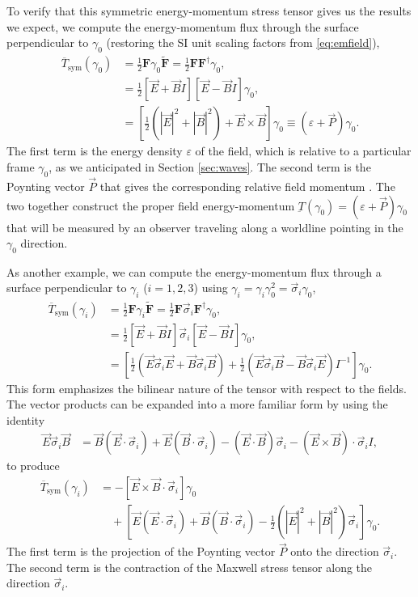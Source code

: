 \documentclass[1p,sort&compress]{elsarticle}
\numberwithin{equation}{section}
\newcommand{\rv}[1]{\vec{#1}}
\newcommand{\bv}[1]{\mathbf{#1}}
\begin{document}
To verify that this symmetric energy-momentum stress tensor gives us the results we expect, we compute the energy-momentum flux through the surface perpendicular to $\gamma_0$ (restoring the SI unit scaling factors from \eqref{eq:emfield}),
\begin{align}\label{eq:symemflux}
  \overline{T}_{\text{sym}}(\gamma_0) &= \frac{1}{2}\bv{F}\gamma_0\widetilde{\bv{F}} = \frac{1}{2}\bv{F}\bv{F}^\dagger\gamma_0, \\
  &= \frac{1}{2}\left[\rv{E} + \rv{B}I\right]\left[\rv{E} - \rv{B}I\right]\gamma_0, \nonumber \\
  &= \left[\frac{1}{2}\left(|\rv{E}|^2 + |\rv{B}|^2\right) + \rv{E}\times\rv{B}\right]\gamma_0 \equiv (\varepsilon + \rv{P})\gamma_0. \nonumber 
\end{align}
The first term is the energy density $\varepsilon$ of the field, which is relative to a particular frame $\gamma_0$, as we anticipated in Section \ref{sec:waves}.  The second term is the Poynting vector $\rv{P}$ that gives the corresponding relative field momentum \cite{Doran2007}.  The two together construct the proper field energy-momentum $\underbar{T}(\gamma_0) = (\varepsilon + \rv{P})\gamma_0$ that will be measured by an observer traveling along a worldline pointing in the $\gamma_0$ direction.  

As another example, we can compute the energy-momentum flux through a surface perpendicular to $\gamma_i$ ($i=1,2,3$) using $\gamma_i = \gamma_i\gamma_0^2 = \rv{\sigma}_i\gamma_0$,
\begin{align}
  \overline{T}_{\text{sym}}(\gamma_i) &= \frac{1}{2}\bv{F}\gamma_i\widetilde{\bv{F}} = \frac{1}{2}\bv{F}\rv{\sigma}_i\bv{F}^\dagger\gamma_0, \\
  &= \frac{1}{2}\left[\rv{E} + \rv{B}I\right]\rv{\sigma}_i\left[\rv{E} - \rv{B}I\right]\gamma_0, \nonumber \\
  &= \left[\frac{1}{2}\left(\rv{E}\rv{\sigma}_i\rv{E} + \rv{B}\rv{\sigma}_i\rv{B}\right) + \frac{1}{2}\left(\rv{E}\rv{\sigma}_i\rv{B} - \rv{B}\rv{\sigma}_i\rv{E}\right)I^{-1}\right]\gamma_0. \nonumber
\end{align}
This form emphasizes the bilinear nature of the tensor with respect to the fields.  The vector products can be expanded into a more familiar form by using the identity
\begin{align}
  \rv{E}\rv{\sigma}_i\rv{B} &= \rv{B}(\rv{E}\cdot\rv{\sigma}_i) + \rv{E}(\rv{B}\cdot\rv{\sigma}_i) - (\rv{E}\cdot\rv{B})\rv{\sigma}_i - (\rv{E}\times\rv{B})\cdot\rv{\sigma}_i I,
\end{align}
to produce
\begin{align}\label{eq:symemstressmaxwell}
  \overline{T}_{\text{sym}}(\gamma_i) &= -\left[\rv{E}\times\rv{B}\cdot\rv{\sigma}_i\right]\gamma_0 \\
  &\quad + \left[\rv{E}(\rv{E}\cdot\rv{\sigma}_i) + \rv{B}(\rv{B}\cdot\rv{\sigma}_i) - \frac{1}{2}\left(|\rv{E}|^2 + |\rv{B}|^2\right)\rv{\sigma}_i\right]\gamma_0. \nonumber
\end{align}
The first term is the projection of the Poynting vector $\rv{P}$ onto the direction $\rv{\sigma}_i$.  The second term is the contraction of the Maxwell stress tensor along the direction $\rv{\sigma}_i$.
\end{document}
